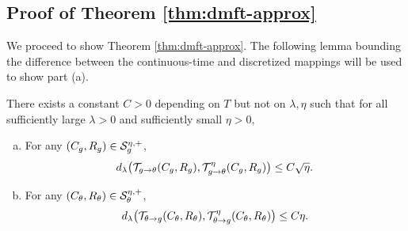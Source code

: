 \subsection{Proof of Theorem \ref{thm:dmft-approx}}

We proceed to show Theorem \ref{thm:dmft-approx}. The following lemma bounding
the difference between the continuous-time and discretized mappings will be
used to show part (a).

\begin{lemma}\label{lem:DMFT-mapping-discretization-distance}
There exists a constant $C>0$ depending on $T$ but not on $\lambda,\eta$
such that for all sufficiently large $\lambda>0$ and
sufficiently small $\eta>0$,
\begin{enumerate}[(a)]
\item For any $(C_g,R_g) \in \mathcal{S}_g^{\eta,+}$,
\[d_\lambda\big(\mathcal{T}_{g\to \theta}(C_g,R_g),\mathcal{T}_{g\to \theta}^\eta(C_g,R_g)\big)
\le C\sqrt{\eta}.\]
\item For any $(C_\theta,R_\theta) \in \mathcal{S}_\theta^{\eta,+}$,
\[d_\lambda\big(\mathcal{T}_{\theta\to g}(C_\theta,R_\theta),\mathcal{T}_{\theta\to
g}^{\eta}(C_\theta,R_\theta)\big) \le C\eta.\]
\end{enumerate}
\end{lemma}
